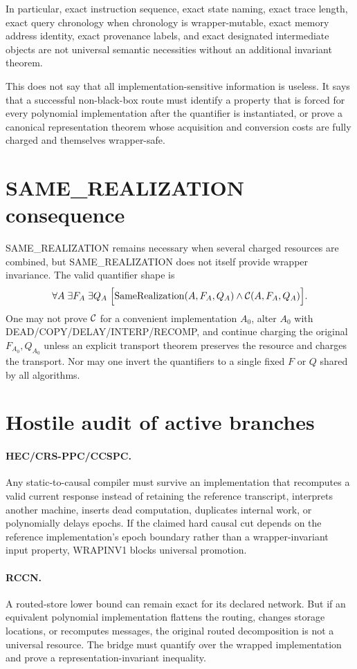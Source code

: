 \documentclass[11pt]{article}
\begin{document}
In particular, exact instruction sequence, exact state naming, exact trace length, exact query chronology when chronology is wrapper-mutable, exact memory address identity, exact provenance labels, and exact designated intermediate objects are not universal semantic necessities without an additional invariant theorem.

This does not say that all implementation-sensitive information is useless. It says that a successful non-black-box route must identify a property that is forced for every polynomial implementation after the quantifier is instantiated, or prove a canonical representation theorem whose acquisition and conversion costs are fully charged and themselves wrapper-safe.

\section*{SAME\_REALIZATION consequence}
SAME\_REALIZATION remains necessary when several charged resources are combined, but SAME\_REALIZATION does not itself provide wrapper invariance. The valid quantifier shape is
\[
\forall A\;\exists F_A\;\exists Q_A\;
\Bigl[
\operatorname{SameRealization}(A,F_A,Q_A)
\wedge {\cal C}(A,F_A,Q_A)
\Bigr].
\]
One may not prove \({\cal C}\) for a convenient implementation \(A_0\), alter \(A_0\) with DEAD/COPY/DELAY/INTERP/RECOMP, and continue charging the original \(F_{A_0},Q_{A_0}\) unless an explicit transport theorem preserves the resource and charges the transport. Nor may one invert the quantifiers to a single fixed \(F\) or \(Q\) shared by all algorithms.

\section*{Hostile audit of active branches}
\paragraph{HEC/CRS-PPC/CCSPC.}
Any static-to-causal compiler must survive an implementation that recomputes a valid current response instead of retaining the reference transcript, interprets another machine, inserts dead computation, duplicates internal work, or polynomially delays epochs. If the claimed hard causal cut depends on the reference implementation's epoch boundary rather than a wrapper-invariant input property, WRAPINV1 blocks universal promotion.

\paragraph{RCCN.}
A routed-store lower bound can remain exact for its declared network. But if an equivalent polynomial implementation flattens the routing, changes storage locations, or recomputes messages, the original routed decomposition is not a universal resource. The bridge must quantify over the wrapped implementation and prove a representation-invariant inequality.
\end{document}
